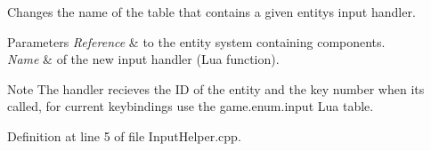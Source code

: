 Changes the name of the table that contains a given entity\textquotesingle{}s input handler. 


\begin{DoxyParams}{Parameters}
{\em Reference} & to the entity system containing components. \\
\hline
{\em Name} & of the new input handler (Lua function). \\
\hline
\end{DoxyParams}
\begin{DoxyNote}{Note}
The handler recieves the ID of the entity and the key number when it\textquotesingle{}s called, for current keybindings use the game.\+enum.\+input Lua table. 
\end{DoxyNote}


Definition at line 5 of file Input\+Helper.\+cpp.

